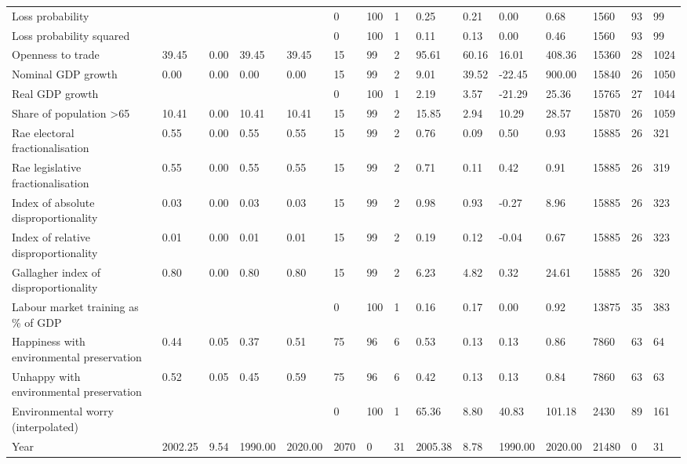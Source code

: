 \begin{longtable}{lllllllllllllll}
Loss probability &  &  &  &  & 0 & 100 & 1 & 0.25 & 0.21 & 0.00 & 0.68 & 1560 & 93 & 99\\
Loss probability squared &  &  &  &  & 0 & 100 & 1 & 0.11 & 0.13 & 0.00 & 0.46 & 1560 & 93 & 99\\
Openness to trade & 39.45 & 0.00 & 39.45 & 39.45 & 15 & 99 & 2 & 95.61 & 60.16 & 16.01 & 408.36 & 15360 & 28 & 1024\\
Nominal GDP growth & 0.00 & 0.00 & 0.00 & 0.00 & 15 & 99 & 2 & 9.01 & 39.52 & -22.45 & 900.00 & 15840 & 26 & 1050\\
\addlinespace
Real GDP growth &  &  &  &  & 0 & 100 & 1 & 2.19 & 3.57 & -21.29 & 25.36 & 15765 & 27 & 1044\\
Share of population >65 & 10.41 & 0.00 & 10.41 & 10.41 & 15 & 99 & 2 & 15.85 & 2.94 & 10.29 & 28.57 & 15870 & 26 & 1059\\
Rae electoral fractionalisation & 0.55 & 0.00 & 0.55 & 0.55 & 15 & 99 & 2 & 0.76 & 0.09 & 0.50 & 0.93 & 15885 & 26 & 321\\
Rae legislative fractionalisation & 0.55 & 0.00 & 0.55 & 0.55 & 15 & 99 & 2 & 0.71 & 0.11 & 0.42 & 0.91 & 15885 & 26 & 319\\
Index of absolute disproportionality & 0.03 & 0.00 & 0.03 & 0.03 & 15 & 99 & 2 & 0.98 & 0.93 & -0.27 & 8.96 & 15885 & 26 & 323\\
\addlinespace
Index of relative disproportionality & 0.01 & 0.00 & 0.01 & 0.01 & 15 & 99 & 2 & 0.19 & 0.12 & -0.04 & 0.67 & 15885 & 26 & 323\\
Gallagher index of disproportionality & 0.80 & 0.00 & 0.80 & 0.80 & 15 & 99 & 2 & 6.23 & 4.82 & 0.32 & 24.61 & 15885 & 26 & 320\\
Labour market training as \% of GDP &  &  &  &  & 0 & 100 & 1 & 0.16 & 0.17 & 0.00 & 0.92 & 13875 & 35 & 383\\
Happiness with environmental preservation & 0.44 & 0.05 & 0.37 & 0.51 & 75 & 96 & 6 & 0.53 & 0.13 & 0.13 & 0.86 & 7860 & 63 & 64\\
Unhappy with environmental preservation & 0.52 & 0.05 & 0.45 & 0.59 & 75 & 96 & 6 & 0.42 & 0.13 & 0.13 & 0.84 & 7860 & 63 & 63\\
\addlinespace
Environmental worry (interpolated) &  &  &  &  & 0 & 100 & 1 & 65.36 & 8.80 & 40.83 & 101.18 & 2430 & 89 & 161\\
Year & 2002.25 & 9.54 & 1990.00 & 2020.00 & 2070 & 0 & 31 & 2005.38 & 8.78 & 1990.00 & 2020.00 & 21480 & 0 & 31\\
\bottomrule
\end{longtable}
